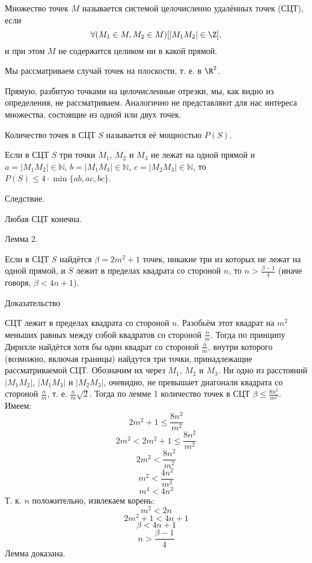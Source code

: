 \documentclass[a4paper,14pt]{article}
\begin{document}
\large

\begin{opr}

Множество точек $M$ называется системой целочисленно удалённых точек (СЦТ), если
$$
\forall(M_1 \in M, M_2\in M)[|M_1 M_2|\in\Z],
$$
и при этом $M$ не содержится целиком ни в какой прямой.

\end{opr}


\begin{zamech}

Мы рассматриваем случай точек на плоскости, т. е. в $\R^2$.

\end{zamech}

\begin{zamech}

Прямую, разбитую точками на целочисленные отрезки, мы, как видно из определения, не рассматриваем.
Аналогично не представляют для нас интереса множества, состоящие из одной или двух точек.

\end{zamech}


\begin{opr}

Количество точек в СЦТ $S$ называется её мощностью $P(S)$.

\end{opr}

\begin{lemma}

Если в СЦТ $S$ три точки $M_1$, $M_2$ и $M_3$ не лежат на одной прямой и 
$a=|M_1 M_2| \in \mathbb{N}$,
$b=|M_1 M_3| \in \mathbb{N}$,
$c=|M_2 M_3| \in \mathbb{N}$,
то 
$P(S) \leq 4\cdot\min\{ab,ac,bc\}$.

\end{lemma}

Следствие.

Любая СЦТ конечна.

Лемма 2.

Если в СЦТ $S$ найдётся $\beta = 2m^2 +1$ точек, никакие три из которых не лежат на одной прямой, и $S$ лежит в пределах квадрата со стороной $n$, то $n > \frac{\beta - 1}{4}$ (иначе говоря, $ \beta < 4n +1$).

Доказательство

СЦТ лежит в пределах квадрата со стороной $n$. Разобьём этот квадрат на $m^2$ меньших равных между собой квадратов со стороной $\frac{n}{m}$. Тогда по принципу Дирихле найдётся хотя бы один квадрат со стороной $\frac{n}{m}$, внутри которого (возможно, включая границы) найдутся три точки, принадлежащие рассматриваемой СЦТ. Обозначим их через $M_1$, $M_2$ и $M_3$. Ни одно из расстояний $|M_1 M_2|$, $|M_1 M_3|$ и $|M_2 M_3|$, очевидно, не превышает диагонали квадрата со стороной $\frac{n}{m}$, т. е. $\frac{n}{m}\sqrt{2}$. Тогда по лемме 1 количество точек в СЦТ $\beta \le \frac{8n^2}{m^2}$. Имеем:
$$ 2m^2+1 \le \frac{8n^2}{m^2}$$
$$ 2m^2 < 2m^2+1 \le \frac{8n^2}{m^2}$$
$$ 2m^2 < \frac{8n^2}{m^2}$$
$$ m^2 < \frac{4n^2}{m^2}$$
$$ m^4 < 4n^2$$
Т. к. $n$ положительно, извлекаем корень:
$$ m^2 < 2n$$
$$ 2m^2 +1 < 4n +1$$
$$ \beta < 4n +1$$
$$n > \frac{\beta - 1}{4}$$
Лемма доказана.
\end{document}
